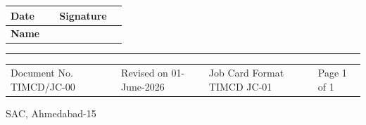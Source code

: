 \documentclass[a4paper,10pt]{article}
\begin{document}
\vspace{1mm}

\begin{tabularx}{\textwidth}{|>{\bfseries}l|X|>{\bfseries}l|X|}
\hline
Date &
&
Signature &
\\[4mm]
\hline

Name &
&
&
\\
\hline

\end{tabularx}


\hrule
\vspace{2mm}

\footnotesize

\begin{tabularx}{\textwidth}{XXXX}
Document No. TIMCD/JC-00 &
Revised on 01-June-2026 &
Job Card Format TIMCD JC-01 &
Page 1 of 1
\end{tabularx}

\vspace{1mm}

\begin{flushright}
SAC, Ahmedabad-15
\end{flushright}
\end{document}
